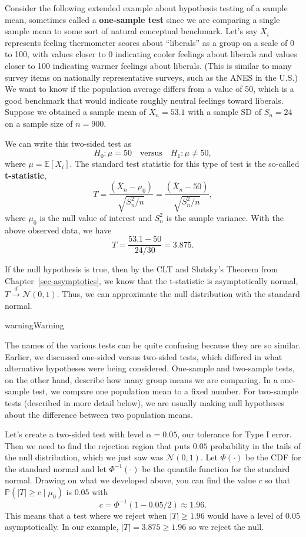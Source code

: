 \documentclass[
  13pt,
  letterpaper,
  DIV=11,
  numbers=noendperiod]{scrreprt}
\newcommand{\E}{\mathbb{E}}
\newcommand{\N}{\mathcal{N}}
\renewcommand{\P}{\mathbb{P}}
\newcommand{\Xbar}{\overline{X}}
\newcommand{\indist}{\overset{d}{\to}}
\theoremstyle{plain}
\theoremstyle{plain}
\theoremstyle{definition}
\theoremstyle{definition}
\theoremstyle{remark}
\begin{document}
Consider the following extended example about hypothesis testing of a
sample mean, sometimes called a \textbf{one-sample test} since we are
comparing a single sample mean to some sort of natural conceptual
benchmark. Let's say \(X_i\) represents feeling thermometer scores about
``liberals'' as a group on a scale of 0 to 100, with values closer to 0
indicating cooler feelings about liberals and values closer to 100
indicating warmer feelings about liberals. (This is similar to many
survey items on nationally representative surveys, such as the ANES in
the U.S.) We want to know if the population average differs from a value
of 50, which is a good benchmark that would indicate roughly neutral
feelings toward liberals. Suppose we obtained a sample mean of
\(\Xbar_n = 53.1\) with a sample SD of \(S_n = 24\) on a sample size of
\(n = 900\).

We can write this two-sided test as \[
H_0: \mu = 50 \quad\text{versus}\quad H_1: \mu \neq 50,
\] where \(\mu = \E[X_i]\). The standard test statistic for this type of
test is the so-called \textbf{t-statistic}, \[ 
T = \frac{\left( \Xbar_n - \mu_0 \right)}{\sqrt{S_n^2 / n}} =\frac{\left( \Xbar_n - 50 \right)}{\sqrt{S_n^2 / n}},
\] where \(\mu_0\) is the null value of interest and \(S_n^2\) is the
sample variance. With the above observed data, we have \[
T = \frac{53.1 - 50}{24 / 30} = 3.875.
\]

If the null hypothesis is true, then by the CLT and Slutsky's Theorem
from Chapter~\ref{sec-asymptotics}, we know that the t-statistic is
asymptotically normal, \(T \indist \N(0, 1)\). Thus, we can approximate
the null distribution with the standard normal.

\begin{bookcallout}{warning}{Warning}

The names of the various tests can be quite confusing because they are
so similar. Earlier, we discussed one-sided versus two-sided tests,
which differed in what alternative hypotheses were being considered.
One-sample and two-sample tests, on the other hand, describe how many
group means we are comparing. In a one-sample test, we compare one
population mean to a fixed number. For two-sample tests (described in
more detail below), we are usually making null hypotheses about the
difference between two population means.

\end{bookcallout}

Let's create a two-sided test with level \(\alpha = 0.05\), our
tolerance for Type I error. Then we need to find the rejection region
that puts \(0.05\) probability in the tails of the null distribution,
which we just saw was \(\N(0,1)\). Let \(\Phi(\cdot)\) be the CDF for
the standard normal and let \(\Phi^{-1}(\cdot)\) be the quantile
function for the standard normal. Drawing on what we developed above,
you can find the value \(c\) so that \(\P(|T| \geq c \mid \mu_0)\) is
0.05 with \[
c = \Phi^{-1}(1 - 0.05/2) \approx 1.96.
\] This means that a test where we reject when \(|T| \geq 1.96\) would
have a level of 0.05 asymptotically. In our example,
\(|T| = 3.875 \geq 1.96\) so we reject the null.
\end{document}
